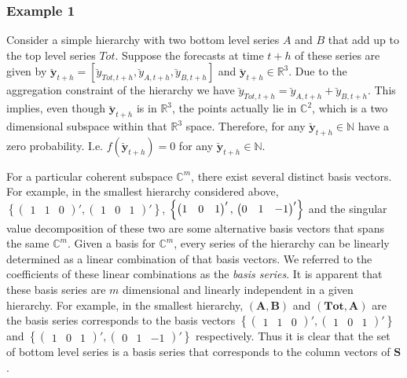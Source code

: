 \documentclass[a4paper, 11pt]{article}
\begin{document}
	\subsubsection*{Example 1}
	
	Consider a simple hierarchy with two bottom level series $A$ and $B$ that add up to the top level series $Tot$. Suppose the forecasts at time $t+h$ of these series are given by $\mathbold{\breve{y}}_{t+h} = [\breve{y}_{Tot,t+h},\breve{y}_{A,t+h}, \breve{y}_{B,t+h}]$ and $\mathbold{\breve{y}}_{t+h} \in \bm{\mathbb{R}}^3$. Due to the aggregation constraint of the hierarchy we have $\breve{y}_{Tot,t+h}=\breve{y}_{A,t+h}+\breve{y}_{B,t+h}$. This implies, even though  $\mathbold{\breve{y}}_{t+h}$ is in $\bm{\mathbb{R}}^3$, the points actually lie in $\bm{\mathbb{C}}^2$, which is a two dimensional subspace within that $\bm{\mathbb{R}}^3$ space. Therefore, for any $\mathbold{\breve{y}}_{t+h} \in \bm{\mathbb{N}}$ have a zero probability. I.e. $f(\mathbold{\breve{y}}_{t+h})=0$ for any $\mathbold{\breve{y}}_{t+h} \in \bm{\mathbb{N}}$.
	
	For a particular coherent subspace $\bm{\mathbb{C}}^m$, there exist several distinct basis vectors. For example, in the smallest hierarchy considered above, $\left\{\begin{pmatrix} 1&1&0 \end{pmatrix}', \begin{pmatrix} 1&0&1 \end{pmatrix}'\right\}$, $\left\{\begin{pmatrix} 1&0&1 \end{pmatrix}',\\ \begin{pmatrix}
	0&1&-1 \end{pmatrix}'\right\}$ and the singular value decomposition of these two are some alternative basis vectors that spans the same $\bm{\mathbb{C}}^m$. Given a basis for $\bm{\mathbb{C}}^m$, every series of the hierarchy can be linearly determined as a linear combination of that basis vectors. We referred to the coefficients of these linear combinations as the \textit{basis series}. It is apparent that these basis series are $m$ dimensional and linearly independent in a given hierarchy. For example, in the smallest hierarchy, $(\bm{A,B})$ and $(\bm{Tot,A})$ are the basis series corresponds to the basis vectors $\left\{\begin{pmatrix} 1&1&0 \end{pmatrix}', \begin{pmatrix} 1&0&1 \end{pmatrix}'\right\}$ and $\left\{\begin{pmatrix} 1&0&1 \end{pmatrix}', \begin{pmatrix}
	0&1&-1 \end{pmatrix}'\right\}$ respectively. Thus it is clear that the set of bottom level series is a basis series that corresponds to the column vectors of $\bm{S}$. 
	
\end{document}
